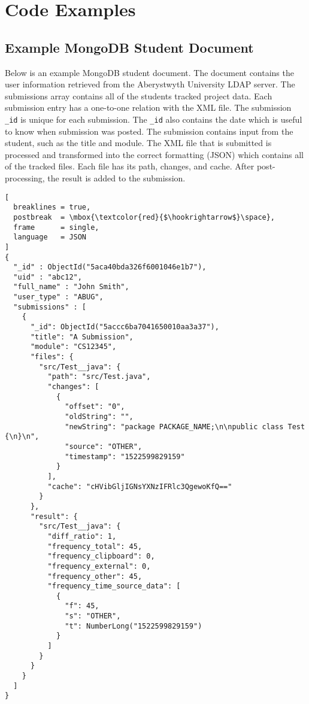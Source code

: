 \chapter{Code Examples}
\label{chp:code-examples}
\section{Example MongoDB Student Document}
\label{sec:mongodb-student-document}

Below is an example MongoDB student document. The document contains the user information retrieved from the Aberystwyth University LDAP server. The submissions array contains all of the students tracked project data. Each submission entry has a one-to-one relation with the XML file. The submission \texttt{\_id} is unique for each submission. The \texttt{\_id} also contains the date which is useful to know when submission was posted. The submission contains input from the student, such as the title and module. The XML file that is submitted is processed and transformed into the correct formatting (JSON) which contains all of the tracked files. Each file has its path, changes, and cache. After post-processing, the result is added to the submission. 

\begin{lstlisting}[
  breaklines = true,
  postbreak  = \mbox{\textcolor{red}{$\hookrightarrow$}\space},
  frame      = single,
  language   = JSON
]
{
  "_id" : ObjectId("5aca40bda326f6001046e1b7"),
  "uid" : "abc12",
  "full_name" : "John Smith",
  "user_type" : "ABUG",
  "submissions" : [
    {
      "_id": ObjectId("5accc6ba7041650010aa3a37"),
      "title": "A Submission",
      "module": "CS12345",
      "files": {
        "src/Test__java": {
          "path": "src/Test.java",
          "changes": [
            {
              "offset": "0",
              "oldString": "",
              "newString": "package PACKAGE_NAME;\n\npublic class Test {\n}\n",
              "source": "OTHER",
              "timestamp": "1522599829159"
            }
          ],
          "cache": "cHVibGljIGNsYXNzIFRlc3QgewoKfQ=="
        }
      },
      "result": {
        "src/Test__java": {
          "diff_ratio": 1,
          "frequency_total": 45,
          "frequency_clipboard": 0,
          "frequency_external": 0,
          "frequency_other": 45,
          "frequency_time_source_data": [
            {
              "f": 45,
              "s": "OTHER",
              "t": NumberLong("1522599829159")
            }
          ]
        }
      }
    }
  ]
}
\end{lstlisting}
